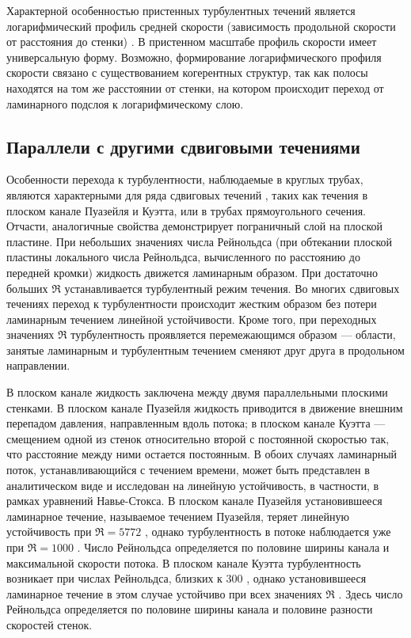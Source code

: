 Характерной особенностью пристенных турбулентных течений является логарифмический профиль средней скорости (зависимость продольной скорости от расстояния до стенки) \cite{Kim1987}. В пристенном масштабе профиль скорости имеет универсальную форму. Возможно, формирование логарифмического профиля скорости связано с существованием когерентных структур, так как полосы находятся на том же расстоянии от стенки, на котором происходит переход от ламинарного подслоя к логарифмическому слою.


	\subsection{Параллели с другими сдвиговыми течениями}

Особенности перехода к турбулентности, наблюдаемые в круглых трубах, являются характерными для ряда сдвиговых течений \cite{Manneville2015, Manneville2016}, таких как течения в плоском канале Пуазейля и Куэтта, или в трубах прямоугольного сечения. Отчасти, аналогичные свойства демонстрирует пограничный слой на плоской пластине. При небольших значениях числа Рейнольдса (при обтекании плоской пластины локального числа Рейнольдса, вычисленного по расстоянию до передней кромки) жидкость движется ламинарным образом. При достаточно больших $\Re$ устанавливается турбулентный режим течения. Во многих сдвиговых течениях переход к турбулентности происходит жестким образом без потери ламинарным течением линейной устойчивости. Кроме того, при переходных значениях $\Re$ турбулентность проявляется перемежающимся образом --- области, занятые ламинарным и турбулентным течением сменяют друг друга в продольном направлении.  

В плоском канале жидкость заключена между двумя параллельными плоскими стенками. В плоском канале Пуазейля жидкость приводится в движение внешним перепадом давления, направленным вдоль потока; в плоском канале Куэтта --- смещением одной из стенок относительно второй с постоянной скоростью так, что расстояние между ними остается постоянным. В обоих случаях ламинарный поток, устанавливающийся с течением времени, может быть представлен в аналитическом виде и исследован на линейную устойчивость, в частности, в рамках уравнений Навье-Стокса. В плоском канале Пуазейля установившееся ламинарное течение, называемое течением Пуазейля, теряет линейную устойчивость при $\Re = 5772$ \cite{Orszag1971}, однако турбулентность в потоке наблюдается уже при $\Re = 1000$ \cite{Orszag1980}. Число Рейнольдса определяется по половине ширины канала и максимальной скорости потока. В плоском канале Куэтта турбулентность возникает при числах Рейнольдса, близких к $300$ \cite{Bottin1998}, однако установившееся ламинарное течение в этом случае устойчиво при всех значениях $\Re$ \cite{Romanov1973}. Здесь число Рейнольдса определяется по половине ширины канала и половине разности скоростей стенок. 

